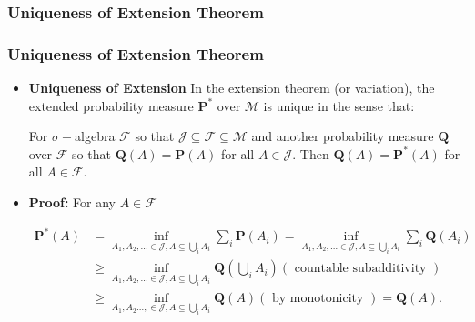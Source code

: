 \documentclass[handout]{beamer}
\newcommand{\BP}{\mathbf{P}}
\begin{document}
\subsubsection{Uniqueness of Extension Theorem}
\frame
{
  \frametitle{Uniqueness of Extension Theorem}

   \begin{itemize}
       \item<1->[]    \begin{Theorem}[Proposition 2.5.7] \textbf{Uniqueness of Extension }In the extension theorem (or variation), the extended probability measure $\BP^*$ over $\mathcal{M}$ is unique in the sense that:
       
       For $\sigma-$algebra $\mathcal{F}$ so that $\mathcal{J} \subseteq \mathcal{F} \subseteq \mathcal{M}$ and another probability measure $\mathbf{Q}$ over $\mathcal{F}$ so that  $\mathbf{Q}(A)=\BP(A)$ for all $A\in\mathcal{J}$. Then  $\mathbf{Q}(A)=\BP^*(A)$ for all $A\in\mathcal{F}$.
            
            
            \end{Theorem}    
    
            \item<2->\textbf{Proof:} For any $A\in\mathcal{F}$
            
                \begin{align*} \BP^*(A)& =\inf_{A_1,A_2,\ldots \in \mathcal{J}, A\subseteq \bigcup_i A_i} \sum_i \BP(A_i) =\inf_{A_1,A_2,\ldots \in \mathcal{J}, A\subseteq \bigcup_i A_i} \sum_i \mathbf{Q}(A_i) \\ 
                &\geq \inf_{A_1,A_2,\ldots \in \mathcal{J}, A\subseteq \bigcup_i A_i} \mathbf{Q}\left( \bigcup_i A_i\right)   (\text{ countable subadditivity }) \\
                &\geq \inf_{A_1,A_2\ldots, \in \mathcal{J}, A\subseteq \bigcup_i A_i} \mathbf{Q}(A)   (\text{ by monotonicity }) = \mathbf{Q}(A). 
                \end{align*}

            
                   \end{itemize}
}
\end{document}
